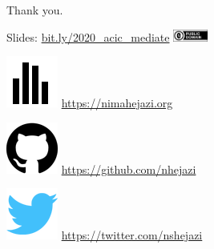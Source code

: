 \documentclass{beamer}
\begin{document}

\begin{frame}[c]{Thank you.}

\large
Slides: \href{http://bit.ly/2020\_acic\_mediate}{bit.ly/2020\_acic\_mediate}
  \quad
\includegraphics[height=4mm]{Figs/cc-zero.png}

\vspace{2mm}
\includegraphics[scale=0.14]{homepage.png} \url{https://nimahejazi.org}

\vspace{2mm}
\includegraphics[scale=0.11]{github-icon.png}
  \url{https://github.com/nhejazi}

\vspace{2mm}
\includegraphics[scale=0.14]{twitter-icon.png}
  \url{https://twitter.com/nshejazi}

\end{frame}




\end{document}
